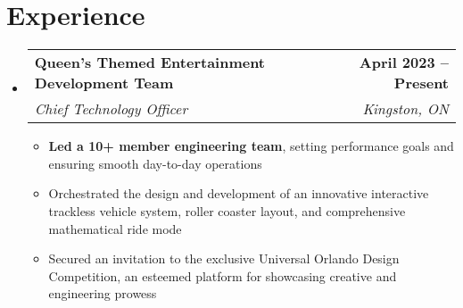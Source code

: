 \documentclass[letterpaper,11pt]{article}
\makeatletter
\newcommand{\resumeItem}[1]{
  \item\small{
    {#1 \vspace{-2pt}}
  }
}
\newcommand{\resumeSubheading}[4]{
  \vspace{-2pt}\item
    \begin{tabular*}{1.0\textwidth}[t]{l@{\extracolsep{\fill}}r}
      \textbf{#1} & \textbf{\small #2} \\
      \textit{\small#3} & \textit{\small #4} \\
    \end{tabular*}\vspace{-7pt}
}
\newcommand{\resumeSubHeadingListStart}{\begin{itemize}[leftmargin=0.0in, label={}]}
\newcommand{\resumeSubHeadingListEnd}{\end{itemize}}
\newcommand{\resumeItemListStart}{\begin{itemize}}
\newcommand{\resumeItemListEnd}{\end{itemize}\vspace{-5pt}}
\makeatother
\begin{document}
\section{Experience}
  \resumeSubHeadingListStart

    \resumeSubheading
      {Queen's Themed Entertainment Development Team}{April 2023 -- Present}
      {Chief Technology Officer}{Kingston, ON}
      \resumeItemListStart
        \resumeItem{\textbf{Led a 10+ member engineering team}, setting performance goals and ensuring smooth day-to-day operations}
        \resumeItem{Orchestrated the design and development of an innovative interactive trackless vehicle system, roller coaster layout, and comprehensive mathematical ride mode}
        \resumeItem{Secured an invitation to the exclusive Universal Orlando Design Competition, an esteemed platform for showcasing creative and engineering prowess}
      \resumeItemListEnd

    
  \resumeSubHeadingListEnd
\vspace{-16pt}

\end{document}
